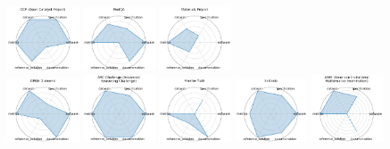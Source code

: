 \begin{figure}[ht!]
\includegraphics[width=0.1900\textwidth]{images/ocp_open_catalyst_project_radar.pdf}
\includegraphics[width=0.1900\textwidth]{images/medqa_radar.pdf}
\includegraphics[width=0.1900\textwidth]{images/materials_project_radar.pdf}
\\[1ex]
\includegraphics[width=0.1900\textwidth]{images/gpqa_diamond_radar.pdf}
\includegraphics[width=0.1900\textwidth]{images/arc-challenge_advanced_reasoning_challenge_radar.pdf}
\includegraphics[width=0.1900\textwidth]{images/frontiermath_radar.pdf}
\includegraphics[width=0.1900\textwidth]{images/scicode_radar.pdf}
\includegraphics[width=0.1900\textwidth]{images/aime_american_invitational_mathematics_examination_radar.pdf}

\end{figure}
